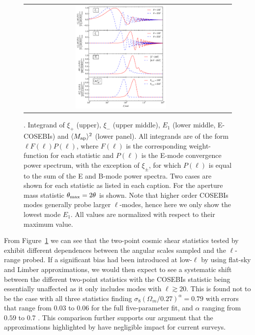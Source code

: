 \begin{figure}%
\begin{center}
\begin{tabular}{ccc}
\includegraphics[width=0.48\textwidth]{figures/IntegAll.pdf} \\
\end{tabular}
\caption{ \small{\label{fig:filters}. Integrand of $\xi_+$ (upper), $\xi_-$
(upper middle), $E_1$ (lower middle, E-COSEBIs) and $\langle M_{\rm ap}
\rangle^2$ (lower panel). All integrands are of the form $\ell F(\ell)
P(\ell)$, where $F(\ell)$ is the corresponding weight-function for each
statistic and $P(\ell)$ is the E-mode convergence power spectrum, with the
exception of $\xi_\pm$, for which $P(\ell)$ is equal to the sum of the E and
B-mode power spectra. Two cases are shown for each statistic as listed in each
caption. For the aperture mass statistic $\theta_{\rm max}=2\theta$ is shown.
Note that higher order COSEBIs modes generally probe larger $\ell$-modes, hence
here we only show the lowest mode $E_1$. All values are normalized with respect
to their maximum value. } }
\end{center}
\end{figure}

From Figure~\ref{fig:filters} we can see that the two-point cosmic shear
statistics tested by \citet{CFHTLenS-2pt-notomo} exhibit different dependences
between the angular scales sampled and the $\ell$-range probed.   If a
significant bias had been introduced at low-$\ell$ by using flat-sky and Limber
approximations, we would then expect to see a systematic shift between the
different two-point statistics with the COSEBIs statistic being essentially
unaffected as it only includes modes with $\ell \gtrsim 20$.  This is found not
to be the case with all three statistics finding $\sigma_8
(\Omega_m/0.27)^\alpha = 0.79$ with errors that range from $0.03$ to $0.06$ for
the full five-parameter fit, and $\alpha$ ranging from $0.59$ to 0.7 \citep[see
Table 5 of][]{CFHTLenS-2pt-notomo}.  This comparison further supports our
argument that the approximations highlighted by \citet{2016arXiv161104954K}
have negligible impact for current surveys.

